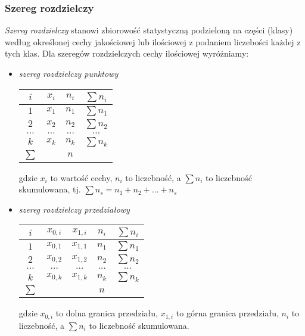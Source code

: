 \documentclass[../Matematyka.tex]{subfiles}
\begin{document}
\subsubsection*{Szereg rozdzielczy}
\textit{Szereg rozdzielczy} stanowi zbiorowość statystyczną podzieloną na części (klasy) według określonej cechy jakościowej lub ilościowej z podaniem liczebości każdej z tych klas. Dla szeregów rozdzielczych cechy ilościowej wyróżniamy:
\begin{itemize}
    \item \textit{szereg rozdzielczy punktowy}
          \begin{table}[H]
              \centering
              \begin{tabular}{c|c|c|c}
                  \(i\)     & \(x_i\)   & \(n_i\)   & \(\sum n_i\) \\ \hline
                  \(1\)     & \(x_1\)   & \(n_1\)   & \(\sum n_1\) \\
                  \(2\)     & \(x_2\)   & \(n_2\)   & \(\sum n_2\) \\
                  \(\dots\) & \(\dots\) & \(\dots\) & \(\dots\)    \\
                  \(k\)     & \(x_k\)   & \(n_k\)   & \(\sum n_k\) \\ \hline\hline
                  \(\sum\)  &           & \(n\)     &              \\
              \end{tabular}
          \end{table}
          gdzie \(x_i\) to wartość cechy, \(n_i\) to liczebność, a \(\sum n_i\) to liczebność skumulowana, tj. \(\sum n_s = n_1 + n_2 + \ldots + n_s\)
    \item \textit{szereg rozdzielczy przedziałowy}
          \begin{table}[H]
              \centering
              \begin{tabular}{c|c|c|c|c}
                  \(i\)     & \(x_{0,i}\) & \(x_{1,i}\) & \(n_i\)   & \(\sum n_i\) \\ \hline
                  \(1\)     & \(x_{0,1}\) & \(x_{1,1}\) & \(n_1\)   & \(\sum n_1\) \\
                  \(2\)     & \(x_{0,2}\) & \(x_{1,2}\) & \(n_2\)   & \(\sum n_2\) \\
                  \(\dots\) & \(\dots\)   & \(\dots\)   & \(\dots\) & \(\dots\)    \\
                  \(k\)     & \(x_{0,k}\) & \(x_{1,k}\) & \(n_k\)   & \(\sum n_k\) \\ \hline\hline
                  \(\sum\)  &             &             & \(n\)     &              \\
              \end{tabular}
          \end{table}
          gdzie \(x_{0,i}\) to dolna granica przedziału, \(x_{1,i}\) to górna granica przedziału, \(n_i\) to liczebność, a \(\sum n_i\) to liczebność skumulowana.
\end{itemize}
\end{document}
